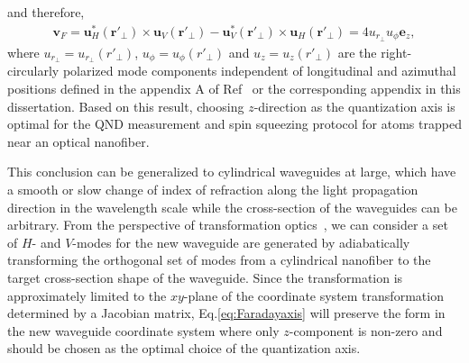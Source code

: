 \documentclass[preprint,aps,pra,onecolumn,superscriptaddress]{revtex4-1} %
\def\br{\mathbf{r}}
\begin{document}
and therefore,
\begin{align}\label{eq:Faradayaxis}
\mathbf{v}_F=\mathbf{u}_H^*(\br'\!_\perp)\!\times\!\mathbf{u}_{V}(\br'\!_\perp)\!-\!\mathbf{u}_V^*(\br'\!_\perp)\!\times\!\mathbf{u}_{H}(\br'\!_\perp) = 4u_{r\!_\perp} u_\phi\mathbf{e}_z,
\end{align}
where $ u_{r\!_\perp}=u_{r\!_\perp}(r'\!_\perp) $, $ u_\phi=u_\phi(r'\!_\perp) $ and $ u_z=u_z(r'\!_\perp) $ are the right-circularly polarized mode components independent of longitudinal and azimuthal positions defined in the appendix A of Ref~\cite{Qi2016} or the corresponding appendix in this dissertation.
Based on this result, choosing $ z $-direction as the quantization axis is optimal for the QND measurement and spin squeezing protocol for atoms trapped near an optical nanofiber.

This conclusion can be generalized to cylindrical waveguides at large, which have a smooth or slow change of index of refraction along the light propagation direction in the wavelength scale while the cross-section of the waveguides can be arbitrary.
From the perspective of transformation optics~\cite{Leonhardt2006Optical,Kundtz2011Electromagnetic}, we can consider a set of $H$- and $V$-modes for the new waveguide are generated by adiabatically transforming the orthogonal set of modes from a cylindrical nanofiber to the target cross-section shape of the waveguide.
Since the transformation is approximately limited to the $xy$-plane of the coordinate system transformation determined by a Jacobian matrix, Eq.\eqref{eq:Faradayaxis} will preserve the form in the new waveguide coordinate system where only $ z $-component is non-zero and should be chosen as the optimal choice of the quantization axis.
\end{document}
